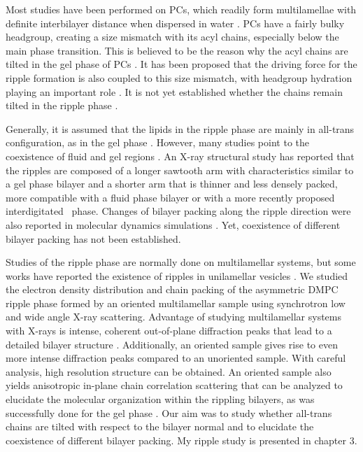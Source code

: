 Most studies have been performed on PCs, which readily form multilamellae
with definite interbilayer distance when dispersed in water \cite{Nagle00}.
PCs have a fairly bulky headgroup, creating a size mismatch with its acyl chains,
especially below the main phase transition. This is believed to be the 
reason why the acyl chains are tilted in the gel phase of PCs \cite{Nagle00,ref:Mcintosh80,ref:Nagle76}.
It has been proposed that the driving force for the ripple formation is also 
coupled to this size mismatch, with headgroup hydration playing an important role
\cite{ref:Cevc91,ref:Carlson87}.
It is not yet established whether the chains remain tilted in the ripple phase \cite{ref:Sun96}.

Generally, it is assumed that the lipids in the ripple phase are mainly in all-trans
configuration, as in the gel phase \cite{ref:Sengupta03}.
However, many studies point to the coexistence of fluid and gel regions
\cite{ref:Wittebort81,ref:Schneider83,ref:Sun96,ref:Marsh80,ref:Cunningham98,ref:Rappolt00}.
An X-ray structural study has reported that the ripples are composed of 
a longer sawtooth arm with characteristics similar to a gel phase bilayer 
and a shorter arm that is thinner and less densely packed\cite{ref:Sun96}, 
more compatible with a fluid phase bilayer or with a more recently proposed
interdigitated \LI\ phase.
Changes of bilayer packing along the ripple direction were also reported in
molecular dynamics simulations \cite{ref:deVries05}.
Yet, coexistence of different bilayer packing has not been established.
 
Studies of the ripple phase are normally done on multilamellar systems, but
some works have reported the existence of ripples in unilamellar vesicles
\cite{ref:Mason99,ref:Parente84}.
We studied the electron density distribution and chain packing 
of the asymmetric DMPC ripple phase formed by an oriented multilamellar sample
using synchrotron low and wide angle X-ray scattering.
Advantage of studying multilamellar systems with X-rays 
is intense, coherent out-of-plane diffraction peaks that lead to a detailed
bilayer structure \cite{ref:Sun96}.
Additionally, an oriented sample gives rise to even more intense diffraction peaks
compared to an unoriented sample. With careful analysis, high resolution
structure can be obtained.
An oriented sample also yields anisotropic
in-plane chain correlation scattering 
that can be analyzed to elucidate the molecular organization within 
the rippling bilayers, as was successfully done for the gel phase 
\cite{ref:Tardieu73,ref:Smith88,ref:Tristram93}.
Our aim was to study whether all-trans chains are tilted with respect to 
the bilayer normal and to elucidate the coexistence of different bilayer packing.
My ripple study is presented in chapter 3. 

